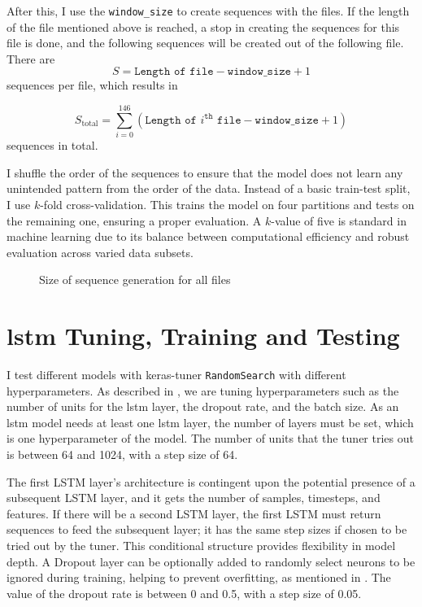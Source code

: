 After this, I use the \texttt{window\_size} to create sequences with the files.
If the length of the file mentioned above is reached, a stop in creating the sequences for this file is done, and the following sequences will be created out of the following file.
There are 
\[S = \texttt{Length of file} - \texttt{window\_size} + 1\] 
sequences per file, which results in 

\[
    S_{\text{total}} = \sum_{i=0}^{146} (\texttt{Length of } i^{\texttt{th}} \texttt{ file} - \texttt{window\_size} + 1)
\]
sequences in total.

I shuffle the order of the sequences to ensure that the model does not learn any unintended pattern from the order of the data.
Instead of a basic train-test split, I use $k$-fold cross-validation.
This trains the model on four partitions and tests on the remaining one, ensuring a proper evaluation.
A $k$-value of five is standard in machine learning due to its balance between computational efficiency and robust evaluation across varied data subsets.

\begin{figure}[h]
    \centering
    \resizebox{0.95\textwidth}{!}{}
    \caption{Size of sequence generation for all files}
    \label{fig:sequence_generation}
\end{figure}

\section{\ac{lstm} Tuning, Training and Testing}

I test different models with keras-tuner \texttt{RandomSearch} with different hyperparameters.
As described in , we are tuning hyperparameters such as the number of units for the \ac{lstm} layer, the dropout rate, and the batch size.
As an \ac{lstm} model needs at least one \ac{lstm} layer, the number of layers must be set, which is one hyperparameter of the model.
The number of units that the tuner tries out is between 64 and 1024, with a step size of 64.

The first LSTM layer's architecture is contingent upon the potential presence of a subsequent LSTM layer, and it gets the number of samples, timesteps, and features.
If there will be a second LSTM layer, the first LSTM must return sequences to feed the subsequent layer; it has the same step sizes if chosen to be tried out by the tuner.
This conditional structure provides flexibility in model depth.
A Dropout layer can be optionally added to randomly select neurons to be ignored during training, helping to prevent overfitting, as mentioned in .
The value of the dropout rate is between 0 and 0.5, with a step size of 0.05.

